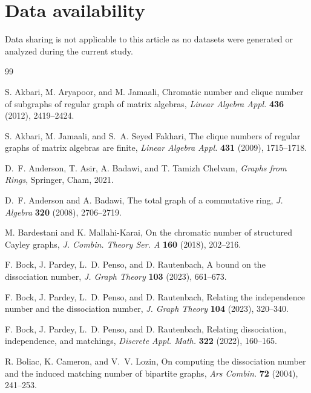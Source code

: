 \documentclass[11pt]{article}
\theoremstyle{definition}
\begin{document}

\section*{Data availability}

Data sharing is not applicable to this article as no datasets were generated or analyzed during the current study.

\begin{thebibliography}{99}

S. Akbari, M. Aryapoor, and M. Jamaali,
Chromatic number and clique number of subgraphs of regular graph of matrix
algebras,
\emph{Linear Algebra Appl.} \textbf{436} (2012), 2419--2424.

S. Akbari, M. Jamaali, and S.~A. Seyed Fakhari,
The clique numbers of regular graphs of matrix algebras are finite,
\emph{Linear Algebra Appl.} \textbf{431} (2009), 1715--1718.

D.~F. Anderson, T. Asir, A. Badawi, and T. Tamizh Chelvam,
\emph{Graphs from Rings}, Springer, Cham, 2021.

D.~F. Anderson and A. Badawi,
The total graph of a commutative ring,
\emph{J. Algebra} \textbf{320} (2008), 2706--2719.

M. Bardestani and K. Mallahi-Karai,
On the chromatic number of structured Cayley graphs,
\emph{J. Combin. Theory Ser. A} \textbf{160} (2018), 202--216.

F. Bock, J. Pardey, L.~D. Penso, and D. Rautenbach,
A bound on the dissociation number,
\emph{J. Graph Theory} \textbf{103} (2023), 661--673.

F. Bock, J. Pardey, L.~D. Penso, and D. Rautenbach,
Relating the independence number and the dissociation number,
\emph{J. Graph Theory} \textbf{104} (2023), 320--340.

F. Bock, J. Pardey, L.~D. Penso, and D. Rautenbach,
Relating dissociation, independence, and matchings,
\emph{Discrete Appl. Math.} \textbf{322} (2022), 160--165.

R. Boliac, K. Cameron, and V.~V. Lozin,
On computing the dissociation number and the induced matching number of
bipartite graphs,
\emph{Ars Combin.} \textbf{72} (2004), 241--253.


\end{thebibliography}
\end{document}
